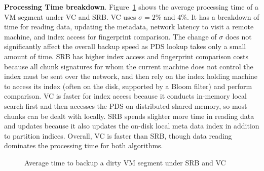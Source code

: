 {\bf Processing Time breakdown}.
Figure~\ref{fig:vc_srb_combined} shows
the  average  processing  time of  a VM segment under VC and SRB. 
VC uses $\sigma=2\%$ and $4\%$.
It has a breakdown of time for reading data, updating the metadata, network latency to visit
a remote machine, and index access for fingerprint comparison.
The change of $\sigma$ does not significantly affect the overall backup speed as
PDS lookup takes only a small amount of time.
SRB has higher index access and fingerprint comparison costs because all chunk signatures for whom the current
machine does not control the index must be sent over the network, and then rely
on the index holding machine to access its index (often on the disk, supported by a Bloom filter) 
and perform comparison.
VC is faster for index access because it conducts in-memory local search first and then
accesses  the PDS on distributed shared memory, so most chunks can be dealt with locally.  
SRB spends  slighter more time in  reading data and updates because it also updates the on-disk
local meta data index in addition to partition indices.
Overall,  VC is faster than SRB, though data reading dominates the processing time for both algorithms.

\begin{figure}[htbp]
  \centering
  \caption{Average time to backup a dirty VM segment under SRB and VC}
  \label{fig:vc_srb_combined}
\end{figure}





